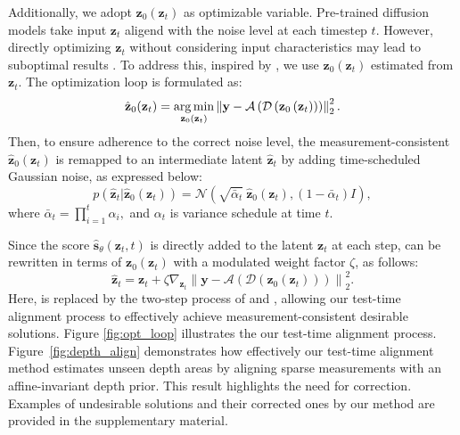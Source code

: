 Additionally, we adopt $\mathbf{z}_0(\mathbf{z}_t)$ as optimizable variable.
Pre-trained diffusion models take input $\mathbf{z}_t$ aligend with the noise level at each timestep $t$.
However, directly optimizing $\mathbf{z}_t$  without considering input characteristics may lead to suboptimal results
\cite{chung2022improving, chung2023dps, chung2024dds}.
To address this, inspired by \citet{song2024solving}, we use $\mathbf{z}_0(\mathbf{z}_t)$ estimated from $\mathbf{z}_t$.
The optimization loop is formulated as:
\begin{equation}
    \label{eq:opt_loop}
    \hat{\mathbf{z}}_0(\mathbf{z}_t) = \argmin_{\mathbf{z}_0(\mathbf{z}_t)} \left\| \mathbf{y} - \mathcal{A}\left(\mathcal{D}\left(\mathbf{z}_0\left(\mathbf{z}_t\right)\right)\right) \right\|_2^2.
\end{equation}
Then, to ensure adherence to the correct noise level, the measurement-consistent $\hat{\mathbf{z}}_0(\mathbf{z}_t)$ is remapped to an intermediate latent $\hat{\mathbf{z}}_t$ by adding time-scheduled Gaussian noise, as expressed below:
\begin{equation}
    \label{eq:remap}
    p\left(\hat{\mathbf{z}}_{t} | \hat{\mathbf{z}}_0(\mathbf{z}_t)\right) = \mathcal{N}(\sqrt{\bar{\alpha}_{t}} ~ \hat{\mathbf{z}}_0(\mathbf{z}_t), (1 - \bar{\alpha}_{t}) I),
\end{equation}
\noindent where $\bar{\alpha}_{t} = \prod_{i=1}^t \alpha_i,$ and $\alpha_t$ is variance schedule at time $t$.

Since the score $\hat{\mathbf{s}}_{\theta}(\mathbf{z}_t, t)$ is directly added to the latent $\mathbf{z}_t$ at each step,
 can be rewritten in terms of $\mathbf{z}_0(\mathbf{z}_t)$ with a modulated weight factor $\zeta$, as follows:
\begin{equation}
    \label{eq:depth_guide_sampling_latent}
    \hat{\mathbf{z}}_t = \mathbf{z}_t + \zeta \nabla_{\mathbf{z}_t} \left\| \mathbf{y} - \mathcal{A}\left(\mathcal{D}\left(\mathbf{z}_0(\mathbf{z}_t)\right)\right) \right\|_2^2.
\end{equation}
Here,  is replaced by the two-step process of  and , allowing our test-time alignment process to effectively achieve measurement-consistent desirable solutions.
Figure \ref{fig:opt_loop} illustrates the our test-time alignment process.
Figure~\ref{fig:depth_align} demonstrates how effectively our test-time alignment method estimates unseen depth areas by aligning sparse measurements with an affine-invariant depth prior. This result highlights the need for correction.
Examples of undesirable solutions and their corrected ones by our method are provided in the supplementary material.

% 

